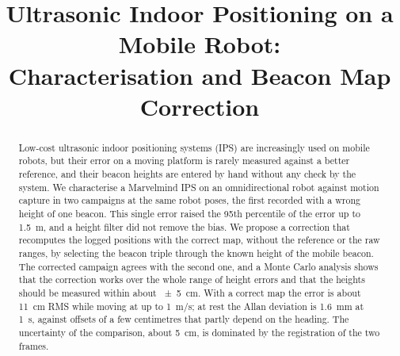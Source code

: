 \documentclass[conference]{IEEEtran}
\begin{document}
\title{Ultrasonic Indoor Positioning on a Mobile Robot:\\
Characterisation and Beacon Map Correction}

\author{
\and
{}
\and
{}
}

\maketitle

\begin{abstract}
Low-cost ultrasonic indoor positioning systems (IPS) are increasingly used on mobile robots, but their
error on a moving platform is rarely measured against a better reference, and their beacon heights are
entered by hand without any check by the system. We characterise a Marvelmind IPS on an
omnidirectional robot against motion capture in two campaigns at the same robot poses, the first
recorded with a wrong height of one beacon. This single error raised the 95th percentile of the error
up to \SI{1.5}{m}, and a height filter did not remove the bias. We propose a correction that recomputes
the logged positions with the correct map, without the reference or the raw ranges, by selecting the
beacon triple through the known height of the mobile beacon. The corrected campaign agrees with the
second one, and a Monte Carlo analysis shows that the correction works over the whole range of height
errors and that the heights should be measured within about \SI{\pm 5}{cm}. With a correct map the
error is about \SI{11}{cm} RMS while moving at up to \SI{1}{m/s}; at rest the Allan deviation is
\SI{1.6}{mm} at \SI{1}{s}, against offsets of a few centimetres that partly depend on the heading. The
uncertainty of the comparison, about \SI{5}{cm}, is dominated by the registration of the two frames.
\end{abstract}
\end{document}
